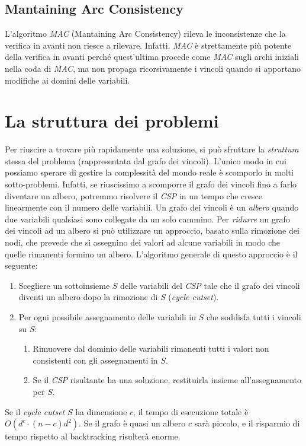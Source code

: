 \documentclass[11pt,oneside]{book}
\begin{document}
\subsection{Mantaining Arc Consistency}
L'algoritmo \textit{MAC} (Mantaining Arc Consistency) rileva le inconsistenze che la verifica in avanti non riesce a rilevare. Infatti, \textit{MAC} è strettamente più potente della verifica in avanti perché quest'ultima procede come \textit{MAC} sugli archi iniziali nella coda di \textit{MAC}, ma non propaga ricorsivamente i vincoli quando si apportano modifiche ai domini delle variabili.


\section{La struttura dei problemi}
Per riuscire a trovare più rapidamente una soluzione, si può sfruttare la \textit{struttura} stessa del problema (rappresentata dal grafo dei vincoli). L'unico modo in cui possiamo sperare di gestire la complessità del mondo reale è scomporlo in molti sotto-problemi. Infatti, se riuscissimo a scomporre il grafo dei vincoli fino a farlo diventare un albero, potremmo risolvere il \textit{CSP} in un tempo che cresce linearmente con il numero delle variabili. Un grafo dei vincoli è un \textit{albero} quando due variabili qualsiasi sono collegate da un solo cammino. Per \textit{ridurre} un grafo dei vincoli ad un albero si può utilizzare un approccio, basato sulla rimozione dei nodi, che prevede che si assegnino dei valori ad alcune variabili in modo che quelle rimanenti formino un albero. L'algoritmo generale di questo approccio è il seguente:
\begin{enumerate}
    \item Scegliere un sottoinsieme $S$ delle variabili del \textit{CSP} tale che il grafo dei vincoli diventi un albero dopo la rimozione di $S$ (\textit{cycle cutset}).
    \item Per ogni possibile assegnamento delle variabili in $S$ che soddisfa tutti i vincoli su $S$:
    \begin{enumerate}
        \item Rimuovere dal dominio delle variabili rimanenti tutti i valori non consistenti con gli assegnamenti in $S$.
        \item Se il \textit{CSP} risultante ha una soluzione, restituirla insieme all'assegnamento per $S$.
    \end{enumerate}
\end{enumerate}
Se il \textit{cycle cutset} $S$ ha dimensione $c$, il tempo di esecuzione totale è $O(d^c \cdot (n-c)d^2)$. Se il grafo è quasi un albero $c$ sarà piccolo, e il risparmio di tempo rispetto al backtracking risulterà enorme.
\end{document}
